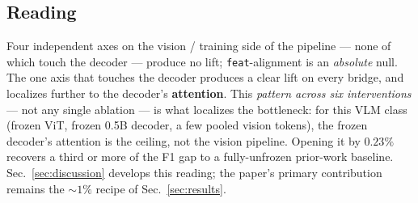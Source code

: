 \subsection{Reading}
\label{sec:abl-summary}

Four independent axes on the vision / training side of the pipeline --- none of
which touch the decoder --- produce no lift; \texttt{feat}-alignment is an
\emph{absolute} null. The one axis that touches the decoder produces a clear lift
on every bridge, and localizes further to the decoder's \textbf{attention}. This
\emph{pattern across six interventions} --- not any single ablation --- is what
localizes the bottleneck: for this VLM class (frozen ViT, frozen 0.5B decoder, a
few pooled vision tokens), the frozen decoder's attention is the ceiling, not the
vision pipeline. Opening it by $0.23\%$ recovers a third or more of the F1 gap to
a fully-unfrozen prior-work baseline. Sec.~\ref{sec:discussion} develops this
reading; the paper's primary contribution remains the ${\sim}1\%$ recipe of
Sec.~\ref{sec:results}.
